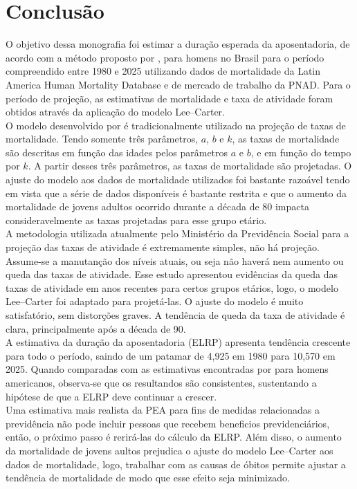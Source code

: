 \documentclass[12pt, 						%
			openright, 					%
			twoside,					%
			a4paper,x					%
			english,					%
			brazil]{abntex2}				%
\begin{document}
    \chapter{Conclusão \label{cap5}}
    O objetivo dessa monografia foi estimar a duração esperada da aposentadoria, de acordo com a método proposto por , para homens no Brasil para o período compreendido entre 1980 e 2025 utilizando dados de mortalidade da Latin America Human Mortality Database e de mercado de trabalho da PNAD. Para o período de projeção, as estimativas de mortalidade e taxa de atividade foram obtidos através da aplicação do modelo Lee--Carter. \\
    O modelo desenvolvido por  é tradicionalmente utilizado na projeção de taxas de mortalidade. Tendo somente três parâmetros, $a$, $b$ e $k$, as taxas de mortalidade são descritas em função das idades pelos parâmetros $a$ e $b$, e em função do tempo por $k$. A partir desses três parâmetros, as taxas de mortalidade são projetadas. O ajuste do modelo aos dados de mortalidade utilizados foi bastante razoável tendo em vista que a série de dados disponíveis é bastante restrita e que o aumento da mortalidade de jovens adultos ocorrido durante a década de 80 impacta consideravelmente as taxas projetadas para esse grupo etário. \\
    A metodologia utilizada atualmente pelo Ministério da Previdência Social para a projeção das taxas de atividade é extremamente simples, não há projeção. Assume-se a manutanção dos níveis atuais, ou seja não haverá nem aumento ou queda das taxas de atividade. Esse estudo apresentou evidências da queda das taxas de atividade em anos recentes para certos grupos etários, logo, o modelo Lee--Carter foi adaptado para projetá-las. O ajuste do modelo é muito satisfatório, sem distorções graves. A tendência de queda da taxa de atividade é clara, principalmente após a década de 90. \\
    A estimativa da duração da aposentadoria (ELRP) apresenta tendência crescente para todo o período, saindo de um patamar de 4,925 em 1980 para 10,570 em 2025. Quando comparadas com as estimativas encontradas por  para homens americanos, observa-se que os resultandos são consistentes, sustentando a hipótese de que a ELRP deve continuar a crescer. \\
    Uma estimativa mais realista da PEA para fins de medidas relacionadas a previdência não pode incluir pessoas que recebem beneficios previdenciários, então, o próximo passo é rerirá-las do cálculo da ELRP. Além disso, o aumento da mortalidade de jovens aultos prejudica o ajuste do modelo Lee--Carter aos dados de mortalidade, logo, trabalhar com as causas de óbitos permite ajustar a tendência de mortalidade de modo que esse efeito seja minimizado. \\
\end{document}
